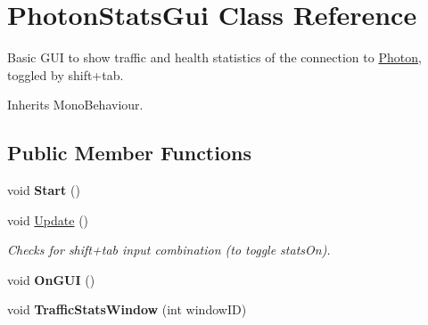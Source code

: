 \hypertarget{class_photon_stats_gui}{}\section{Photon\+Stats\+Gui Class Reference}
\label{class_photon_stats_gui}


Basic G\+UI to show traffic and health statistics of the connection to \hyperlink{namespace_photon}{Photon}, toggled by shift+tab.  




Inherits Mono\+Behaviour.

\subsection*{Public Member Functions}
\begin{DoxyCompactItemize}
\item 
void {\bfseries Start} ()\hypertarget{class_photon_stats_gui_ae7fb408f7fb6e9525337271d2363ae33}{}\label{class_photon_stats_gui_ae7fb408f7fb6e9525337271d2363ae33}

\item 
void \hyperlink{class_photon_stats_gui_a222bbb9f4b1c640489101a5f3bcada8a}{Update} ()
\begin{DoxyCompactList}\small\item\em Checks for shift+tab input combination (to toggle stats\+On).\end{DoxyCompactList}\item 
void {\bfseries On\+G\+UI} ()\hypertarget{class_photon_stats_gui_a8aa98b7db81d540b6e9c42f37d3a927b}{}\label{class_photon_stats_gui_a8aa98b7db81d540b6e9c42f37d3a927b}

\item 
void {\bfseries Traffic\+Stats\+Window} (int window\+ID)\hypertarget{class_photon_stats_gui_a58101a043bbe7de9d53f14ac111646b2}{}\label{class_photon_stats_gui_a58101a043bbe7de9d53f14ac111646b2}

\end{DoxyCompactItemize}
